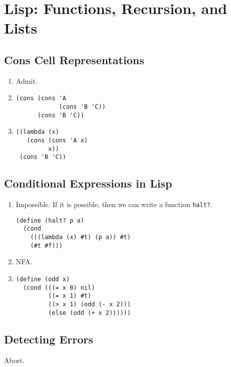 \chapter{Lisp: Functions, Recursion, and Lists}


\section{Cons Cell Representations}
\begin{enumerate}
  \item
    Admit.

  \item
\begin{verbatim}
(cons (cons 'A
            (cons 'B 'C))
      (cons 'B 'C))
\end{verbatim}

  \item
\begin{verbatim}
((lambda (x)
   (cons (cons 'A x)
         x))
 (cons 'B 'C))
\end{verbatim}
\end{enumerate}


\section{Conditional Expressions in Lisp}
\begin{enumerate}
  \item
    Impossible. If it is possible, then we can write a function \texttt{halt?}.
\begin{verbatim}
(define (halt? p a)
  (cond
    (((lambda (x) #t) (p a)) #t)
    (#t #f)))
\end{verbatim}

  \item
    NFA.

  \item
\begin{verbatim}
(define (odd x)
  (cond (((= x 0) nil)
         ((= x 1) #t)
         ((> x 1) (odd (- x 2)))
         (else (odd (+ x 2))))))
\end{verbatim}
\end{enumerate}


\section{Detecting Errors}
Abort.

